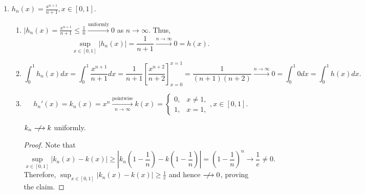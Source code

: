 \documentclass[letterpaper, reqno,11pt]{article}
\begin{document}
\begin{enumerate}
\begin{proof}
    \begin{figure}[H]
      \centering
    \end{figure}

    Then $g_n(x) = 0$ for all $x \in [a, 1]$. Thus,
    $$ \sup_{x \in [a, 1]} |g_n(x)| = 0 \xrightarrow{n \to \infty} 0. $$
  \end{proof}
\item $h_n(x) = \frac{x^{n + 1}}{n + 1}, x \in [0, 1]$.
  \begin{enumerate}
  \item $|h_n(x) = \frac{x^{n + 1}}{n + 1} \leq \frac{1}{n} \xrightarrow{\text{uniformly}} 0$ as $n \to \infty$. Thus,
    $$ \sup_{x \in [0, 1]} |h_n(x)| = \frac{1}{n + 1} \xrightarrow{n \to \infty} 0 = h(x). $$
  \item
    $$ \int_0^1 h_n(x) dx = \int_0^1 \frac{x^{n + 1}}{n + 1} dx = \frac{1}{n + 1} \left[\frac{x^{n + 2}}{n + 2}\right]_{x = 0}^{x = 1} = \frac{1}{(n + 1)(n + 2)} \xrightarrow{n \to \infty} 0 = \int_0^1 0dx = \int_0^1 h(x) dx. $$
  \item
    $$ h_n'(x) = k_n(x) = x^n \xrightarrow[n \to \infty]{\text{pointwise}} k(x) = \left\{
    \begin{array}{ll}
      0, & x \neq 1, \\
      1, & x = 1,
    \end{array}
    \right., x \in [0, 1]. $$

    \begin{claim}
      \normalfont $k_n \centernot\longrightarrow k$ uniformly.
    \end{claim}
    \begin{proof}
      Note that
      $$ \sup_{x \in [0, 1]} |k_n(x) - k(x)| \geq \left|k_n\left(1 - \frac{1}{n}\right) - k\left(1 - \frac{1}{n}\right)\right| = \left(1 - \frac{1}{n}\right)^n \to \frac{1}{e} \neq 0. $$
      Therefore, $\sup_{x \in [0, 1]} |k_n(x) - k(x)| \geq \frac{1}{e}$ and hence $\centernot\longrightarrow 0$, proving the claim.
    \end{proof}


\end{enumerate}
\end{enumerate}
\end{document}
